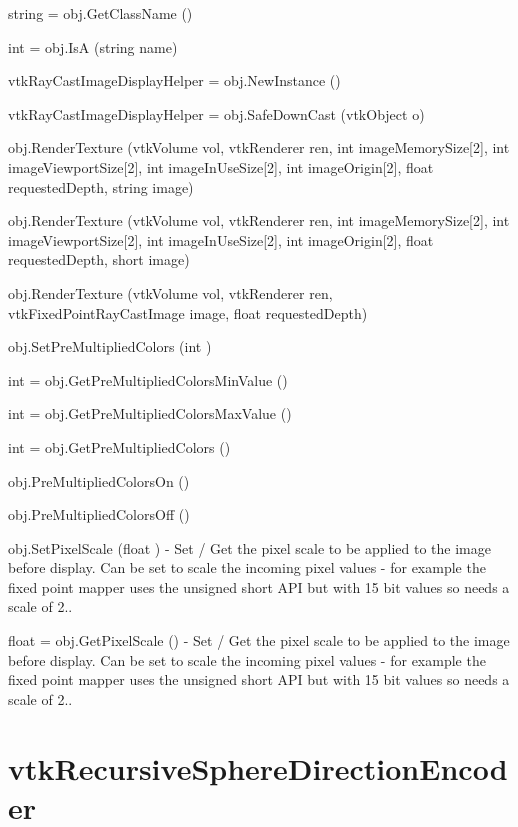 \begin{DoxyItemize}
\item {\ttfamily string = obj.\-Get\-Class\-Name ()}  
\item {\ttfamily int = obj.\-Is\-A (string name)}  
\item {\ttfamily vtk\-Ray\-Cast\-Image\-Display\-Helper = obj.\-New\-Instance ()}  
\item {\ttfamily vtk\-Ray\-Cast\-Image\-Display\-Helper = obj.\-Safe\-Down\-Cast (vtk\-Object o)}  
\item {\ttfamily obj.\-Render\-Texture (vtk\-Volume vol, vtk\-Renderer ren, int image\-Memory\-Size\mbox{[}2\mbox{]}, int image\-Viewport\-Size\mbox{[}2\mbox{]}, int image\-In\-Use\-Size\mbox{[}2\mbox{]}, int image\-Origin\mbox{[}2\mbox{]}, float requested\-Depth, string image)}  
\item {\ttfamily obj.\-Render\-Texture (vtk\-Volume vol, vtk\-Renderer ren, int image\-Memory\-Size\mbox{[}2\mbox{]}, int image\-Viewport\-Size\mbox{[}2\mbox{]}, int image\-In\-Use\-Size\mbox{[}2\mbox{]}, int image\-Origin\mbox{[}2\mbox{]}, float requested\-Depth, short image)}  
\item {\ttfamily obj.\-Render\-Texture (vtk\-Volume vol, vtk\-Renderer ren, vtk\-Fixed\-Point\-Ray\-Cast\-Image image, float requested\-Depth)}  
\item {\ttfamily obj.\-Set\-Pre\-Multiplied\-Colors (int )}  
\item {\ttfamily int = obj.\-Get\-Pre\-Multiplied\-Colors\-Min\-Value ()}  
\item {\ttfamily int = obj.\-Get\-Pre\-Multiplied\-Colors\-Max\-Value ()}  
\item {\ttfamily int = obj.\-Get\-Pre\-Multiplied\-Colors ()}  
\item {\ttfamily obj.\-Pre\-Multiplied\-Colors\-On ()}  
\item {\ttfamily obj.\-Pre\-Multiplied\-Colors\-Off ()}  
\item {\ttfamily obj.\-Set\-Pixel\-Scale (float )} -\/ Set / Get the pixel scale to be applied to the image before display. Can be set to scale the incoming pixel values -\/ for example the fixed point mapper uses the unsigned short A\-P\-I but with 15 bit values so needs a scale of 2..  
\item {\ttfamily float = obj.\-Get\-Pixel\-Scale ()} -\/ Set / Get the pixel scale to be applied to the image before display. Can be set to scale the incoming pixel values -\/ for example the fixed point mapper uses the unsigned short A\-P\-I but with 15 bit values so needs a scale of 2..  
\end{DoxyItemize}\hypertarget{vtkvolumerendering_vtkrecursivespheredirectionencoder}{}\section{vtk\-Recursive\-Sphere\-Direction\-Encoder}\label{vtkvolumerendering_vtkrecursivespheredirectionencoder}

